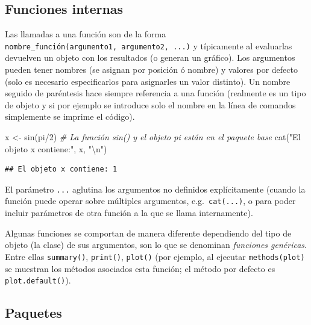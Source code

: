 \documentclass[
]{book}
\newenvironment{Shaded}{\begin{snugshade}}{\end{snugshade}}
\newcommand{\CommentTok}[1]{\textcolor[rgb]{0.56,0.35,0.01}{\textit{#1}}}
\newcommand{\DecValTok}[1]{\textcolor[rgb]{0.00,0.00,0.81}{#1}}
\newcommand{\FunctionTok}[1]{\textcolor[rgb]{0.00,0.00,0.00}{#1}}
\newcommand{\NormalTok}[1]{#1}
\newcommand{\OtherTok}[1]{\textcolor[rgb]{0.56,0.35,0.01}{#1}}
\newcommand{\SpecialCharTok}[1]{\textcolor[rgb]{0.00,0.00,0.00}{#1}}
\newcommand{\StringTok}[1]{\textcolor[rgb]{0.31,0.60,0.02}{#1}}
\theoremstyle{break}
\theoremstyle{nonumberplain}
\begin{document}
\hypertarget{funciones-internas}{%
\subsection{Funciones internas}\label{funciones-internas}}

Las llamadas a una función son de la forma \texttt{nombre\_función(argumento1,\ argumento2,\ ...)} y típicamente al evaluarlas devuelven un objeto con los resultados (o generan un gráfico).
Los argumentos pueden tener nombres (se asignan por posición ó nombre) y valores por defecto (solo es necesario especificarlos para asignarles un valor distinto).
Un nombre seguido de paréntesis hace siempre referencia a una función (realmente es un tipo de objeto y si por ejemplo se introduce solo el nombre en la línea de comandos simplemente se imprime el código).

\begin{Shaded}
\begin{Highlighting}[]
\NormalTok{x }\OtherTok{\textless{}{-}} \FunctionTok{sin}\NormalTok{(pi}\SpecialCharTok{/}\DecValTok{2}\NormalTok{) }
\CommentTok{\# La función \textasciigrave{}sin()\textasciigrave{} y el objeto \textasciigrave{}pi\textasciigrave{} están en el paquete base}
\FunctionTok{cat}\NormalTok{(}\StringTok{"El objeto x contiene:"}\NormalTok{, x, }\StringTok{"}\SpecialCharTok{\textbackslash{}n}\StringTok{"}\NormalTok{)}
\end{Highlighting}
\end{Shaded}

\begin{verbatim}
## El objeto x contiene: 1
\end{verbatim}

El parámetro \texttt{...} aglutina los argumentos no definidos explícitamente (cuando la función puede operar sobre múltiples argumentos, e.g.~\texttt{cat(...)}, o para poder incluir parámetros de otra función a la que se llama internamente).

Algunas funciones se comportan de manera diferente dependiendo del tipo de objeto (la clase) de sus argumentos, son lo que se denominan \emph{funciones genéricas}.
Entre ellas \texttt{summary()}, \texttt{print()}, \texttt{plot()} (por ejemplo, al ejecutar \texttt{methods(plot)} se muestran los métodos asociados esta función; el método por defecto es \texttt{plot.default()}).

\hypertarget{instalacion-pkg}{%
\subsection{Paquetes}\label{instalacion-pkg}}
\end{document}
